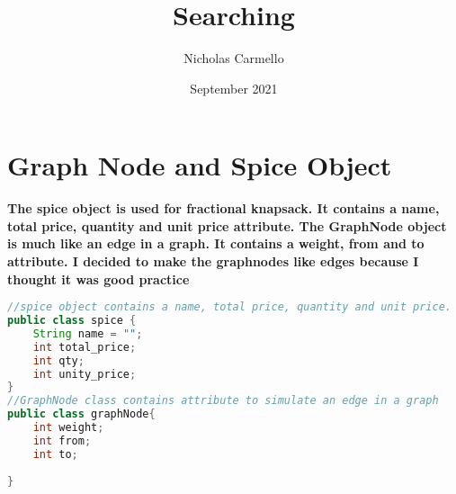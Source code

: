 \documentclass{article}
\begin{document}
\title{Searching}
\author{Nicholas Carmello}
\date{September 2021}
\section{Graph Node and Spice Object}
\textbf{
The spice object is used for fractional knapsack. It contains a name, total price, quantity and unit price attribute.
The GraphNode object is much like an edge in a graph. It contains a weight, from and to attribute. I decided to make the graphnodes like edges because I thought it was good practice 
}
\begin{lstlisting}[language = java]
//spice object contains a name, total price, quantity and unit price.
public class spice {
    String name = "";
    int total_price;
    int qty;
    int unity_price;
}
//GraphNode class contains attribute to simulate an edge in a graph
public class graphNode{
    int weight;
    int from;
    int to;
    
}
\end{lstlisting}
\end{document}
